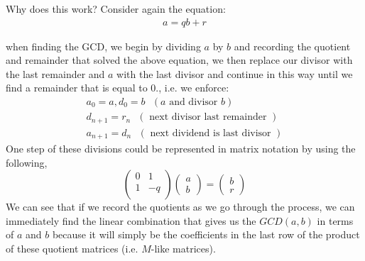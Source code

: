 Why does this work? Consider again the equation:
\begin{align}
    a=qb+r \nonumber
\end{align}

when finding the GCD, we begin by dividing $a$ by $b$ and recording the quotient and remainder that
solved the above equation, we then replace our divisor with the last remainder and $a$ with the last
divisor and continue in this way until we find a remainder that is equal to $0$., i.e. we enforce:
\begin{align}
    a_0=a, d_0=b \ \ \ (a\text{ and divisor }b)\nonumber\\
    d_{n+1}= r_n  \ \ \ (\text{ next divisor last remainder })\nonumber \\
    a_{n+1}= d_n \ \ \ (\text{ next dividend is last divisor })\nonumber
\end{align}
One step of these divisions could be represented in matrix notation by using the following,
\begin{equation}
  \left( {\begin{array}{cc}
   0 & 1 \\
   1 & -q \\
  \end{array} } \right)\left( {\begin{array}{c}
   a\\
   b
  \end{array} } \right)=\left( {\begin{array}{c}
   b\\
   r
  \end{array} } \right)
\nonumber
\end{equation}
We can see that if we record the quotients as we go through the process, we can immediately find the
linear combination that gives us the $GCD(a,b)$ in terms of $a$ and $b$ because it will simply be
the coefficients in the last row of the product of these quotient matrices (i.e. $M$-like matrices).

